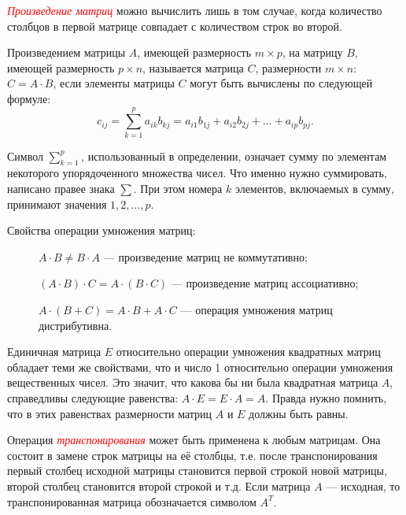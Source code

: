 \documentclass[10pt]{article}
\newcommand{\sym}{\textcolor{red}{\ding{229}}}
\newenvironment{defnt}%
{\begin{center}\fboxsep=1.6\fboxrule \shadowsize=4pt\begin{Sbox}
\begin{minipage}[c]{0.58\textwidth}}%
{\end{minipage}\end{Sbox}\shadowbox{\fboxsep=5pt\colorbox[rgb]{1,0.725,0.474}{\TheSbox}}
\end{center}}
\numberwithin{primer}{section}
\newcommand{\term}[1]{\textcolor{red}{\emph{#1}}}
\numberwithin{equation}{section}
\begin{document}
\term{Произведение матриц} можно вычислить лишь в том случае,
когда количество столбцов в первой матрице совпадает с количеством
строк во второй.
\begin{defnt}   Произведением матрицы $A$, имеющей размерность $m\times
p$, на матрицу $B$, имеющей размерность $p\times n$, называется
матрица $C$, размерности $m\times n$: $C=A\cdot B$, если элементы
матрицы $C$ могут быть вычислены по следующей формуле:
\begin{equation}\label{eq:proizvmatrix}
    c_{ij}=\sum^p_{k=1}a_{ik}b_{kj}=a_{i1}b_{1j}+a_{i2}b_{2j}+\ldots+a_{ip}b_{pj}.
\end{equation}
\end{defnt}

Символ $\sum^p_{k=1}$, использованный в определении, означает сумму
по элементам некоторого упорядоченного множества
чисел. Что именно нужно суммировать, написано правее знака $\sum$.
При этом номера $k$ элементов, включаемых в сумму, принимают
значения $1,2,\ldots,p$.

Свойства операции умножения матриц:
\begin{description}
    \item[\sym] $A\cdot B\neq B\cdot A$ --- произведение матриц не коммутативно;
    \item[\sym] $\left(A\cdot B\right)\cdot C=A\cdot\left(B\cdot C\right)$ ---
    произведение матриц ассоциативно;
    \item[\sym] $A\cdot \left(B+C\right)=A\cdot B+A\cdot C$ ---
    операция умножения матриц дистрибутивна.
\end{description}

Единичная матрица $E$ относительно операции умножения квадратных
матриц обладает теми же свойствами, что и число 1 относительно
операции умножения вещественных чисел. Это значит, что какова бы
ни была квадратная матрица $A$, справедливы следующие равенства:
$A\cdot E=E\cdot A=A$. Правда нужно помнить, что в этих равенствах
размерности матриц $A$ и $E$ должны быть равны.


Операция \term{транспонирования} может быть применена к любым
матрицам. Она состоит в замене строк матрицы на её столбцы, т.е.
после транспонирования первый столбец исходной матрицы становится
первой строкой новой матрицы, второй столбец становится второй
строкой и т.д. Если матрица $A$ --- исходная, то транспонированная
матрица обозначается символом $A^{T}$.
\end{document}
